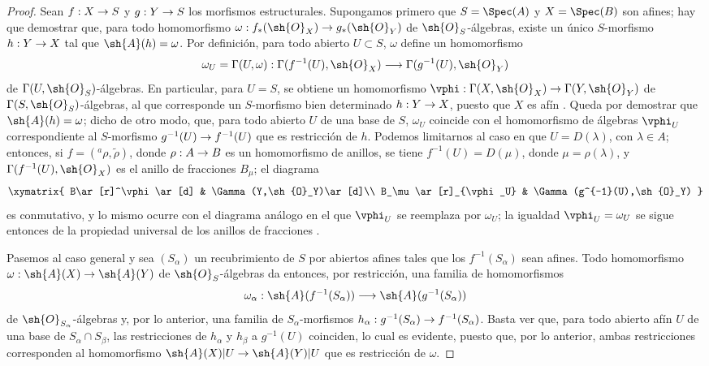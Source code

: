 \documentclass[oneside,10pt]{amsart}
\makeatletter
\newcommand{\ega@arrow}[2]{\mathchoice{#1}{#2}{#2}{#2}}
\renewcommand{\to}{\ega@arrow{\longrightarrow}{\rightarrow}}
\newcommand{\oldpage}[2][]{\marginnote{\normalfont\footnotesize\textbf{#1}~|~#2}\ignorespaces}
\makeatother
\begin{document}
\begin{proof}
Sean $f:X\to S$ y $g:Y\to S$ los morfismos estructurales.
Supongamos primero que $S=\Spec(A)$ y $X=\Spec(B)$ son afines; hay que demostrar que, para todo homomorfismo $\omega:f_*(\sh{O}_X)\to g_*(\sh{O}_Y)$ de $\sh{O}_S$-álgebras, existe un único $S$-morfismo $h:Y\to X$ tal que $\sh{A}(h)=\omega$.
Por definición, para todo abierto $U\subset S$, $\omega$ define un homomorfismo
\[
  \omega_U=\Gamma(U,\omega):
  \Gamma(f^{-1}(U),\sh{O}_X)\to
  \Gamma(g^{-1}(U),\sh{O}_Y)
\]
de $\Gamma(U,\sh{O}_S)$-álgebras.
En particular, para $U=S$, se obtiene un homomorfismo $\vphi:\Gamma(X,\sh{O}_X)\to\Gamma(Y,\sh{O}_Y)$ de $\Gamma(S,\sh{O}_S)$-álgebras, al que corresponde un $S$-morfismo bien determinado $h:Y\to X$, puesto que $X$ es afín .
Queda por demostrar que $\sh{A}(h)=\omega$; dicho de otro modo, que, para todo abierto $U$ de una base de $S$, $\omega_U$ coincide con el homomorfismo de álgebras $\vphi_U$ correspondiente al $S$-morfismo $g^{-1}(U)\to f^{-1}(U)$ que es restricción de $h$.
Podemos limitarnos al caso en que $U=D(\lambda)$, con $\lambda\in A$; entonces, si $f=({}^a\rho,\widetilde{\rho})$, donde $\rho:A\to B$ es un homomorfismo de anillos, se tiene $f^{-1}(U)=D(\mu)$, donde $\mu=\rho(\lambda)$, y $\Gamma(f^{-1}(U),\sh{O}_X)$ es el anillo de fracciones $B_\mu$; el diagrama
\[
  \xymatrix{
    B\ar[r]^\vphi\ar[d] &
    \Gamma(Y,\sh{O}_Y)\ar[d]\\
    B_\mu\ar[r]_{\vphi_U} &
    \Gamma(g^{-1}(U),\sh{O}_Y)
  }
\]
es conmutativo, y lo mismo ocurre con el diagrama análogo en el que $\vphi_U$ se reemplaza por $\omega_U$; la igualdad $\vphi_U=\omega_U$ se sigue entonces de la propiedad universal de los anillos de fracciones .

Pasemos al caso general y sea $(S_\alpha)$ un recubrimiento de $S$ por abiertos afines
\oldpage[II]{8}
tales que los $f^{-1}(S_\alpha)$ sean afines.
Todo homomorfismo $\omega:\sh{A}(X)\to\sh{A}(Y)$ de $\sh{O}_S$-álgebras da entonces, por restricción, una familia de homomorfismos
\[
  \omega_\alpha:\sh{A}(f^{-1}(S_\alpha))\to\sh{A}(g^{-1}(S_\alpha))
\]
de $\sh{O}_{S_\alpha}$-álgebras y, por lo anterior, una familia de $S_\alpha$-morfismos $h_\alpha:g^{-1}(S_\alpha)\to f^{-1}(S_\alpha)$.
Basta ver que, para todo abierto afín $U$ de una base de $S_\alpha\cap S_\beta$, las restricciones de $h_\alpha$ y $h_\beta$ a $g^{-1}(U)$ coinciden, lo cual es evidente, puesto que, por lo anterior, ambas restricciones corresponden al homomorfismo $\sh{A}(X)|U\to\sh{A}(Y)|U$ que es restricción de $\omega$.
\end{proof}
\end{document}
